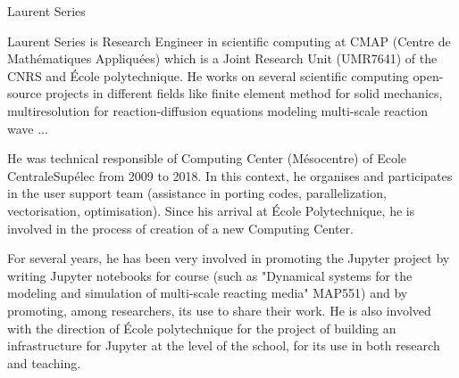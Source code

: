 \begin{participant}[type=R,PM=2,gender=male]{Laurent Series}

    Laurent Series is Research Engineer in scientific computing at CMAP (Centre 
    de Mathématiques Appliquées) which is a Joint Research Unit
    (UMR7641) of the CNRS and \'Ecole polytechnique. He works on several
    scientific computing open-source projects in different fields like
    finite element method for solid mechanics, multiresolution for 
    reaction-diffusion equations modeling multi-scale reaction wave ...
  
    He was technical responsible of Computing Center (M\'esocentre) of Ecole
    CentraleSup\'elec from 2009 to 2018. In this context, he organises and 
    participates in the user support team (assistance in porting codes, 
    parallelization, vectorisation, optimisation). Since his arrival at \'Ecole 
    Polytechnique, he is involved in the process of creation of a new Computing 
    Center.
    
    For several years, he has been very involved in promoting the Jupyter project
    by writing Jupyter notebooks for course (such as "Dynamical systems for the 
    modeling and simulation of multi-scale reacting media" MAP551) and by promoting, 
    among researchers, its use to share their work. He is also involved with the 
    direction of \'Ecole polytechnique for the project of building an infrastructure 
    for Jupyter at the level of the school, for its use in both research and teaching.
  
\end{participant}